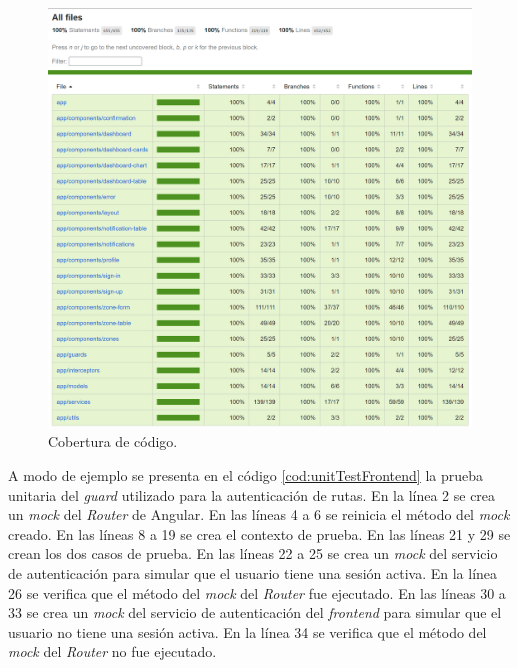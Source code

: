 \begin{figure}[H]
	\centering
	\includegraphics[width=1.0\textwidth]{./Figures/Frontend code coverage.png}
	\caption{Cobertura de código.}
	\label{fig:codeCoverageFrontend}
\end{figure}

A modo de ejemplo se presenta en el código \ref{cod:unitTestFrontend} la prueba unitaria del \emph{guard} utilizado para la autenticación de rutas. En la línea 2  se crea un \emph{mock} del \textit{Router} de Angular. En las líneas 4 a 6 se reinicia el método del \emph{mock} creado. En las líneas 8 a 19 se crea el contexto de prueba. En las líneas 21 y 29 se crean los dos casos de prueba. En las líneas 22 a 25 se crea un \emph{mock} del servicio de autenticación para simular que el usuario tiene una sesión activa. En la línea 26 se verifica que el método del \emph{mock} del \textit{Router} fue ejecutado. En las líneas 30 a 33 se crea un \emph{mock} del servicio de autenticación del \emph{frontend} para simular que el usuario no tiene una sesión activa. En la línea 34 se verifica que el método del \emph{mock} del \textit{Router} no fue ejecutado.

